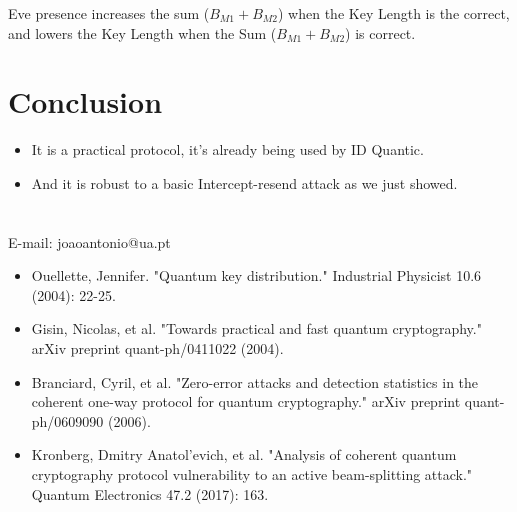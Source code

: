 \documentclass[1000pt]{article}
\newcommand{\mysection}[1]{\section*{\color{black}\sffamily #1}}%
\begin{document}
\begin{description}
\centering
\item Eve presence increases the sum ($B_{M1}+B_{M2}$) when the Key Length is the correct, and lowers the Key Length when the Sum ($B_{M1}+B_{M2}$) is correct.
\end{description}

\mysection{\Huge\textbf{Conclusion}} \Large \vspace*{1cm}
\begin{itemize}
\item It is a practical protocol, it's already being used by ID Quantic.
\item And it is robust to a basic Intercept-resend attack as we just showed.
\end{itemize}
\mysection{} \sffamily \Large
\vspace{-10mm}
\centerline{E-mail: joaoantonio@ua.pt}
\vspace*{7cm}
\begin{itemize}
	\item Ouellette, Jennifer. "Quantum key distribution." Industrial Physicist 10.6 (2004): 22-25.
	\item Gisin, Nicolas, et al. "Towards practical and fast quantum cryptography." arXiv preprint quant-ph/0411022 (2004).
	\item Branciard, Cyril, et al. "Zero-error attacks and detection statistics in the coherent one-way protocol for quantum cryptography." arXiv preprint quant-ph/0609090 (2006).
	\item Kronberg, Dmitry Anatol'evich, et al. "Analysis of coherent quantum cryptography protocol vulnerability to an active beam-splitting attack." Quantum Electronics 47.2 (2017): 163.
\end{itemize}
\end{document}
